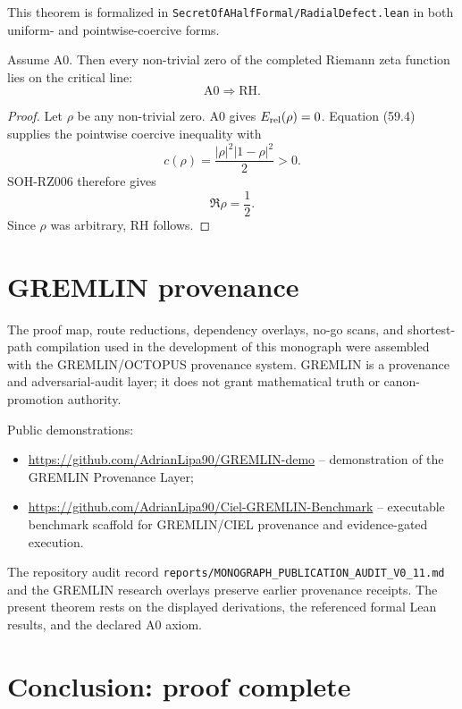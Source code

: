 This theorem is formalized in
\texttt{SecretOfAHalfFormal/RadialDefect.lean} in both uniform- and
pointwise-coercive forms.

\begin{theorem}
\label{thm:zero-axis-rh}
Assume A0.  Then every non-trivial zero of the completed Riemann zeta function
lies on the critical line:
\[
\boxed{
\mathrm{A0}\Longrightarrow\mathrm{RH}.
}
\]
\end{theorem}

\begin{proof}
Let \(\rho\) be any non-trivial zero.  A0 gives
\(E_{\rm rel}(\rho)=0\).  Equation (59.4) supplies the pointwise coercive
inequality with
\[
c(\rho)=\frac{|\rho|^2|1-\rho|^2}{2}>0.
\]
SOH-RZ006 therefore gives
\[
\Re\rho=\frac12.
\]
Since \(\rho\) was arbitrary, RH follows.
\end{proof}

\section{GREMLIN provenance}

The proof map, route reductions, dependency overlays, no-go scans, and
shortest-path compilation used in the development of this monograph were
assembled with the GREMLIN/OCTOPUS provenance system.  GREMLIN is a
provenance and adversarial-audit layer; it does not grant mathematical truth
or canon-promotion authority.

Public demonstrations:

\begin{itemize}
  \item \url{https://github.com/AdrianLipa90/GREMLIN-demo} --
  demonstration of the GREMLIN Provenance Layer;
  \item \url{https://github.com/AdrianLipa90/Ciel-GREMLIN-Benchmark} --
  executable benchmark scaffold for GREMLIN/CIEL provenance and
  evidence-gated execution.
\end{itemize}

The repository audit record
\texttt{reports/MONOGRAPH\_PUBLICATION\_AUDIT\_V0\_11.md} and the GREMLIN
research overlays preserve earlier provenance receipts.  The present theorem
rests on the displayed derivations, the referenced formal Lean results, and
the declared A0 axiom.

\section{Conclusion: proof complete}

